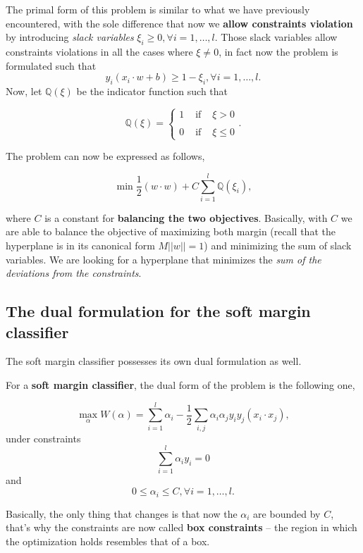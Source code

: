 \documentclass[10pt]{report}
\begin{document}
The primal form of this problem is similar to what we have previously
encountered, with the sole difference that now we \textbf{allow constraints
violation} by introducing \emph{slack variables}
\(\xi_i \geq 0, \forall i=1,\dots,l\). Those slack variables allow
constraints violations in all the cases where \(\xi \neq 0\), in fact
now the problem is formulated such that
\[y_i(x_i \cdot w + b) \geq 1 - \xi_i, \forall i=1,\dots,l.\] Now, let
\(\mathbb{Q}(\xi)\) be the indicator function such that

\[ \mathbb{Q}(\xi) = \left\{ \begin{array}{lll} 1 & \mbox{ if } & \xi > 0 \\ & & \\ 0 & \mbox { if } & \xi \leq 0 \end{array} \right. . \]

The problem can now be expressed as follows,

\[\min \frac 1 2 (w \cdot w) + C\sum_{i=1}^l \mathbb{Q}(\xi_i),\]

where \(C\) is a constant for \textbf{balancing the two objectives}. Basically,
with \(C\) we are able to balance the objective of maximizing both
margin (recall that the hyperplane is in its canonical form
\(M||w|| = 1\)) and minimizing the sum of slack variables. We are looking for a
hyperplane that minimizes the \emph{sum of the deviations from the constraints}.

\subsection{The dual formulation for the soft margin classifier}
\label{the-dual-formulation-for-the-soft-margin-classifier}
The soft margin classifier possesses its own dual formulation as well.

For a \textbf{soft margin classifier}, the dual form of the problem is the following one,

$$\max_\alpha W(\alpha) = \sum_{i=1}^l \alpha_i - \frac 1 2 \sum_{i,j} \alpha_i \alpha_j y_i y_j (x_i \cdot x_j),$$ under constraints $$\sum_{i=1}^l \alpha_i y_i = 0$$ and $$0 \leq \alpha_i \leq C, \forall i=1, \dots, l.$$

Basically, the only thing that changes is that now the \(\alpha_i\) are bounded by
\(C\), that's why the constraints are now called \textbf{box constraints} -- the region
in which the optimization holds resembles that of a box.
\end{document}
